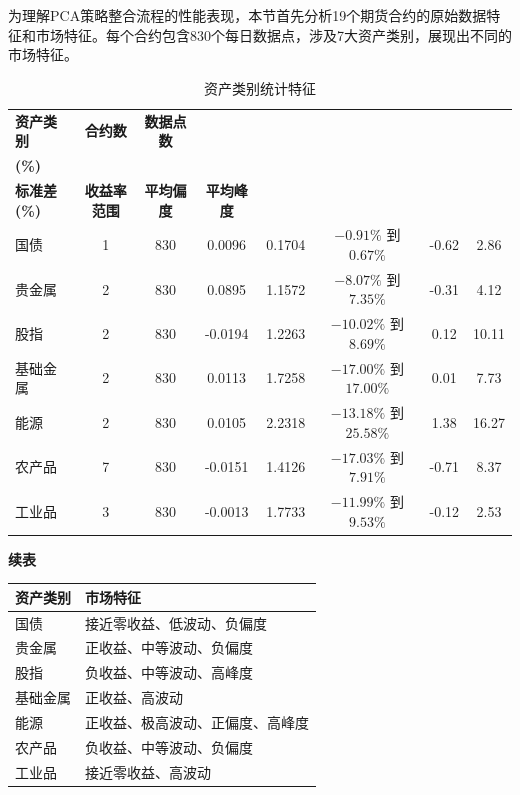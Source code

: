 为理解PCA策略整合流程的性能表现，本节首先分析19个期货合约的原始数据特征和市场特征。每个合约包含830个每日数据点，涉及7大资产类别，展现出不同的市场特征。

\begin{table}[H]
\centering
\caption{资产类别统计特征}
\label{tab:assetstatssideways}
\footnotesize
\setlength{\tabcolsep}{4pt}
\renewcommand{\arraystretch}{1.18}
\begin{tabular}{lccccccc}
\toprule
\textbf{资产类别} & \textbf{合约数} & \textbf{数据点数} & \makecell{\textbf{平均收益率}\\\textbf{(\%)}} & \makecell{\textbf{收益率}\\\textbf{标准差(\%)}} & \textbf{收益率范围} & \textbf{平均偏度} & \textbf{平均峰度} \\
\midrule
国债 & 1 & 830 & 0.0096 & 0.1704 & $-0.91\%$ 到 $0.67\%$ & -0.62 & 2.86 \\
贵金属 & 2 & 830 & 0.0895 & 1.1572 & $-8.07\%$ 到 $7.35\%$ & -0.31 & 4.12 \\
股指 & 2 & 830 & -0.0194 & 1.2263 & $-10.02\%$ 到 $8.69\%$ & 0.12 & 10.11 \\
基础金属 & 2 & 830 & 0.0113 & 1.7258 & $-17.00\%$ 到 $17.00\%$ & 0.01 & 7.73 \\
能源 & 2 & 830 & 0.0105 & 2.2318 & $-13.18\%$ 到 $25.58\%$ & 1.38 & 16.27 \\
农产品 & 7 & 830 & -0.0151 & 1.4126 & $-17.03\%$ 到 $7.91\%$ & -0.71 & 8.37 \\
工业品 & 3 & 830 & -0.0013 & 1.7733 & $-11.99\%$ 到 $9.53\%$ & -0.12 & 2.53 \\
\bottomrule
\end{tabular}
\end{table}
\begin{table}[H]
\centering
{\small\textbf{续表}}\\[0.5em]
\footnotesize
\setlength{\tabcolsep}{6pt}
\renewcommand{\arraystretch}{1.18}
\begin{tabular}{lp{}}
\toprule
\textbf{资产类别} & \textbf{市场特征} \\
\midrule
国债 & 接近零收益、低波动、负偏度 \\
贵金属 & 正收益、中等波动、负偏度 \\
股指 & 负收益、中等波动、高峰度 \\
基础金属 & 正收益、高波动 \\
能源 & 正收益、极高波动、正偏度、高峰度 \\
农产品 & 负收益、中等波动、负偏度 \\
工业品 & 接近零收益、高波动 \\
\bottomrule
\end{tabular}
\end{table}

